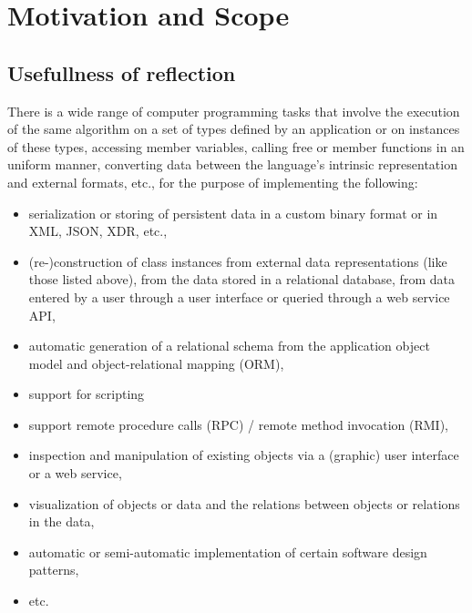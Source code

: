 \section{Motivation and Scope}
\label{section-motivation}

\subsection{Usefullness of reflection}

There is a wide range of computer programming tasks that involve
the execution of the same algorithm on a set of types defined by an
application or on instances of these types, accessing member variables,
calling free or member functions in an uniform
manner, converting data between the language's intrinsic representation and
external formats, etc., for the purpose of implementing the following:

\begin{itemize}

\item serialization or storing of persistent data in a
custom binary format or in XML, JSON, XDR, etc.,

\item (re-)construction of class instances
from external data representations (like those listed above),
from the data stored in a relational database, from data entered by
a user through a user interface or queried through a web service API,

\item automatic generation of a relational schema from the application
object model and object-relational mapping (ORM),

\item support for scripting 

\item support remote procedure calls (RPC) / remote method invocation (RMI),

\item inspection and manipulation of existing objects via a (graphic) user interface
or a web service,

\item visualization of objects or data and the relations between objects or
relations in the data,

\item automatic or semi-automatic implementation of certain software design patterns,

\item etc.

\end{itemize}

